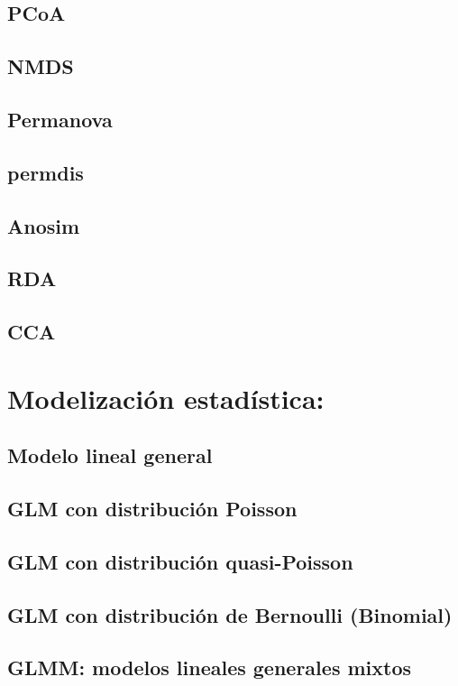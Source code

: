 \documentclass[
]{book}
\begin{document}
\section{PCoA}\label{pcoa}

\section{NMDS}\label{nmds}

\section{Permanova}\label{permanova}

\section{permdis}\label{permdis}

\section{Anosim}\label{anosim}

\section{RDA}\label{rda}

\section{CCA}\label{cca}

\chapter{Modelización estadística:}\label{modelizaciuxf3n-estaduxedstica}

\section{Modelo lineal general}\label{modelo-lineal-general}

\section{GLM con distribución Poisson}\label{glm-con-distribuciuxf3n-poisson}

\section{GLM con distribución quasi-Poisson}\label{glm-con-distribuciuxf3n-quasi-poisson}

\section{GLM con distribución de Bernoulli (Binomial)}\label{glm-con-distribuciuxf3n-de-bernoulli-binomial}

\section{GLMM: modelos lineales generales mixtos}\label{glmm-modelos-lineales-generales-mixtos}
\end{document}

